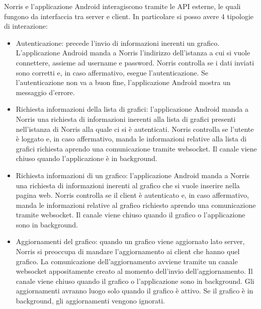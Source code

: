     Norris e l'applicazione Android interagiscono tramite le API esterne, le quali fungono da interfaccia tra server e client. In particolare si posso avere 4 tipologie di interazione:
    \begin{itemize}
        \item Autenticazione: precede l'invio di informazioni inerenti un grafico. L'applicazione Android manda a Norris l'indirizzo dell'istanza a cui si vuole connettere, assieme ad username e password. Norris controlla se i dati inviati sono corretti e, in caso affermativo, esegue l'autenticazione. Se l'autenticazione non va a buon fine, l'applicazione Android mostra un messaggio d'errore.
        \item Richiesta informazioni della lista di grafici: l'applicazione Android manda a Norris una richiesta di informazioni inerenti alla lista di grafici presenti nell'istanza di Norris alla quale ci si è autenticati. Norris controlla se l'utente è loggato e, in caso affermativo, manda le informazioni relative alla lista di grafici richiesta aprendo una comunicazione tramite websocket. Il canale viene chiuso quando l'applicazione è in background.
        \item Richiesta informazioni di un grafico: l'applicazione Android manda a Norris una richiesta di informazioni inerenti al grafico che si vuole inserire nella pagina web. Norris controlla se il client è autenticato e, in caso affermativo, manda le informazioni relative al grafico richiesto aprendo una comunicazione tramite websocket. Il canale viene chiuso quando il grafico o l'applicazione sono in background.
        \item Aggiornamenti del grafico: quando un grafico viene aggiornato lato server, Norris si preoccupa di mandare l'aggiornamento ai client che hanno quel grafico. La comunicazione dell'aggiornamento avviene tramite un canale websocket appositamente creato al momento dell'invio dell'aggiornamento. Il canale viene chiuso quando il grafico o l'applicazione sono in background. Gli aggiornamenti avranno luogo solo quando il grafico è attivo. Se il grafico è in background, gli aggiornamenti vengono ignorati.
    \end{itemize}
